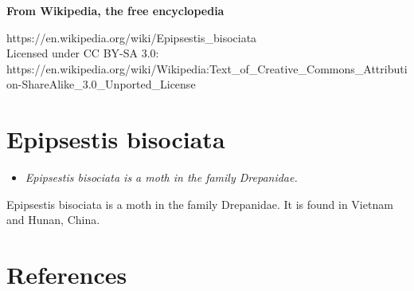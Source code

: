 \textbf{From Wikipedia, the free encyclopedia}

https://en.wikipedia.org/wiki/Epipsestis\_bisociata\\
Licensed under CC BY-SA 3.0:\\
https://en.wikipedia.org/wiki/Wikipedia:Text\_of\_Creative\_Commons\_Attribution-ShareAlike\_3.0\_Unported\_License

\section{Epipsestis bisociata}\label{epipsestis-bisociata}

\begin{itemize}
\item
  \emph{Epipsestis bisociata is a moth in the family Drepanidae.}
\end{itemize}

Epipsestis bisociata is a moth in the family Drepanidae. It is found in
Vietnam and Hunan, China.

\section{References}\label{references}
